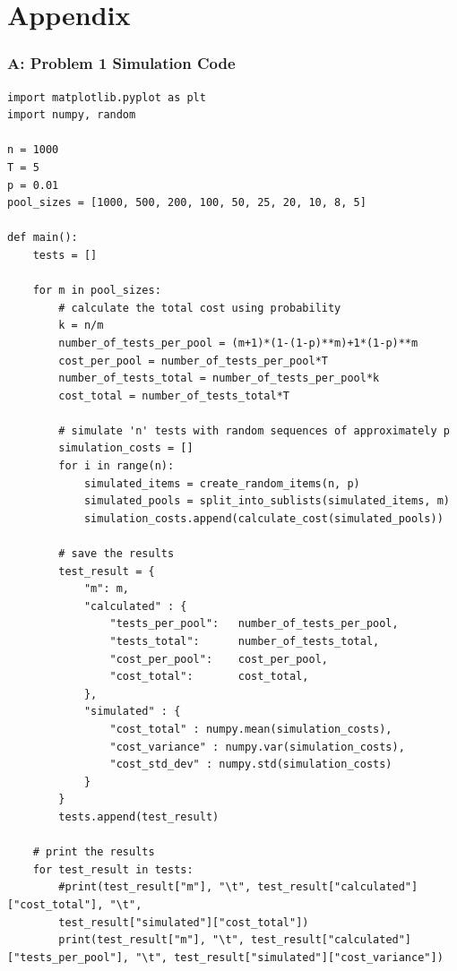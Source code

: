 \documentclass[11pt]{extarticle}
\begin{document}
\newpage

\section*{Appendix}

\subsubsection*{A: Problem 1 Simulation Code}

\scriptsize
\begin{verbatim}
import matplotlib.pyplot as plt
import numpy, random 

n = 1000
T = 5
p = 0.01 
pool_sizes = [1000, 500, 200, 100, 50, 25, 20, 10, 8, 5]

def main():
    tests = []

    for m in pool_sizes:
        # calculate the total cost using probability
        k = n/m 
        number_of_tests_per_pool = (m+1)*(1-(1-p)**m)+1*(1-p)**m
        cost_per_pool = number_of_tests_per_pool*T
        number_of_tests_total = number_of_tests_per_pool*k
        cost_total = number_of_tests_total*T

        # simulate 'n' tests with random sequences of approximately p 
        simulation_costs = []
        for i in range(n):
            simulated_items = create_random_items(n, p)
            simulated_pools = split_into_sublists(simulated_items, m)
            simulation_costs.append(calculate_cost(simulated_pools))

        # save the results
        test_result = {
            "m": m,
            "calculated" : {
                "tests_per_pool":   number_of_tests_per_pool,
                "tests_total":      number_of_tests_total,
                "cost_per_pool":    cost_per_pool,
                "cost_total":       cost_total,
            },
            "simulated" : {
                "cost_total" : numpy.mean(simulation_costs),
                "cost_variance" : numpy.var(simulation_costs),
                "cost_std_dev" : numpy.std(simulation_costs)
            }
        }
        tests.append(test_result)

    # print the results
    for test_result in tests:
        #print(test_result["m"], "\t", test_result["calculated"]["cost_total"], "\t", 
        test_result["simulated"]["cost_total"])
        print(test_result["m"], "\t", test_result["calculated"]["tests_per_pool"], "\t", test_result["simulated"]["cost_variance"])


\end{verbatim}
\end{document}
